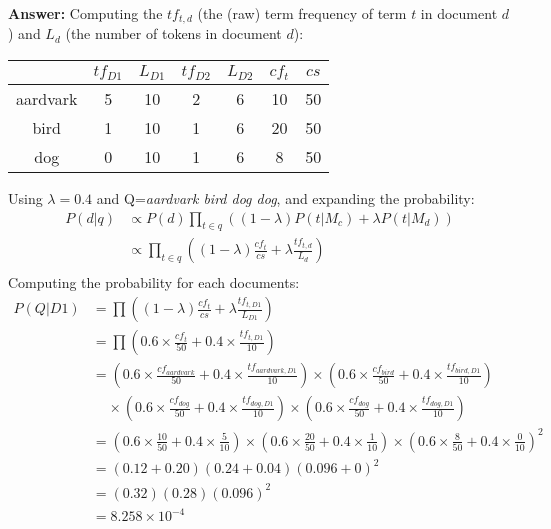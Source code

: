 \documentclass[11pt]{article}
\begin{document}
\begin{enumerate}
        \textbf{Answer:} Computing the $tf_{t,d}$ (the (raw) term frequency of term $t$ in document $d$) and $L_d$ (the number of tokens in document $d$):
        \begin{table}[ht]
            \centering
            \begin{tabular}[t]{|c|c|c|c|c|c|c|}
                \hline
                & \textbf{$tf_{D1}$} & \textbf{$L_{D1}$} & \textbf{$tf_{D2}$} & \textbf{$L_{D2}$} & \textbf{$cf_{t}$} & \textbf{$cs$}
                \\ \hline
                aardvark    & 5 & 10 & 2 & 6 & 10 & 50  
                \\ \hline
                bird        & 1 & 10 & 1 & 6 & 20 & 50
                \\ \hline
                dog         & 0 & 10 & 1 & 6 & 8  & 50
                \\ \hline
            \end{tabular}
        \end{table}
        Using $\lambda = 0.4$ and Q=\textit{aardvark bird dog dog}, and expanding the probability:
        \begin{align*}
            P(d|q) &\propto P(d) \prod_{t \in q} ((1 - \lambda) P(t|M_c) + \lambda P(t|M_d)) \\
            &\propto \prod_{t \in q} \left((1 - \lambda) \frac{cf_{t}}{cs} + \lambda \frac{tf_{t,d}}{L_d}\right) \\
        \end{align*}
        Computing the probability for each documents:
        \begin{align*}
            P(Q|D1) &= \prod \left((1 - \lambda) \frac{cf_{t}}{cs} + \lambda \frac{tf_{t,D1}}{L_{D1}}\right) \\
            &= \prod \left(0.6\times \frac{cf_{t}}{50} + 0.4\times \frac{tf_{t,D1}}{10}\right) \\
            &= \left(0.6\times \frac{cf_{aardvark}}{50} + 0.4\times \frac{tf_{aardvark,D1}}{10}\right) \times \left(0.6\times \frac{cf_{bird}}{50} + 0.4\times \frac{tf_{bird,D1}}{10}\right) \\
            & \ \ \ \ \ \times \left(0.6\times \frac{cf_{dog}}{50} + 0.4\times \frac{tf_{dog,D1}}{10}\right) \times \left(0.6\times \frac{cf_{dog}}{50} + 0.4\times \frac{tf_{dog,D1}}{10}\right) \\
            &= \left(0.6\times \frac{10}{50} + 0.4\times \frac{5}{10}\right) \times \left(0.6\times \frac{20}{50} + 0.4\times \frac{1}{10}\right) \times \left(0.6\times \frac{8}{50} + 0.4\times \frac{0}{10}\right)^2 \\
            &= (0.12 + 0.20)(0.24 + 0.04)(0.096 + 0)^2 \\
            &= (0.32)(0.28)(0.096)^2 \\
            &= 8.258\times 10^{-4}
        \end{align*}


\end{enumerate}
\end{document}
